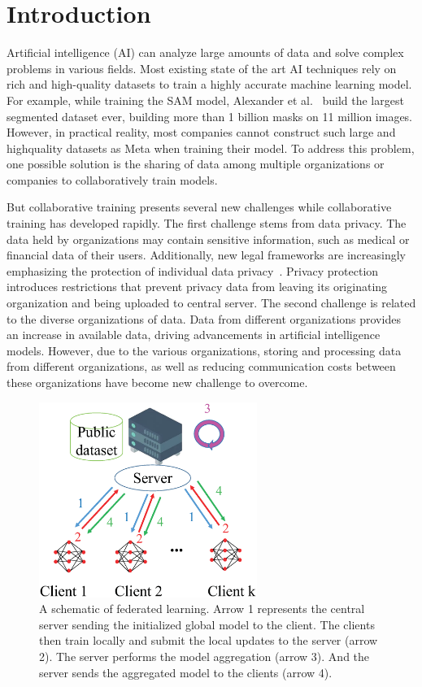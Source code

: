 \section{Introduction}
Artificial intelligence (AI) can analyze large amounts
of data and solve complex problems in various fields.
Most existing state of the art AI techniques rely on
rich and high-quality datasets to train a highly accurate
machine learning model. For example, while training
the SAM model, Alexander et al.~\cite{kirillov2023segment} build the largest
segmented dataset ever, building more than 1 billion
masks on 11 million images. However, in practical reality,
most companies cannot construct such large and highquality datasets as Meta when training their model. To
address this problem, one possible solution is the sharing
of data among multiple organizations or companies to
collaboratively train models.

But collaborative training presents several new challenges while collaborative training has developed rapidly.
The first challenge stems from data privacy. The data held
by organizations may contain sensitive information, such
as medical or financial data of their users. Additionally,
new legal frameworks are increasingly emphasizing the
protection of individual data privacy~\cite{voigt2017eu}. Privacy protection introduces restrictions that prevent privacy data from
leaving its originating organization and being uploaded
to central server. The second challenge is related to the
diverse organizations of data. Data from different organizations provides an increase in available data, driving
advancements in artificial intelligence models. However,
due to the various organizations, storing and processing
data from different organizations, as well as reducing communication costs between these organizations have
become new challenge to overcome.

\begin{figure}[t]
    \centering
  
    \includegraphics[width=1.0\linewidth,height=2.5in]{output/fig1.eps}
     \caption{A schematic of federated learning. Arrow 1 represents the
     central server sending the initialized global model to the client. The
     clients then train locally and submit the local updates to the server
     (arrow 2). The server performs the model aggregation (arrow 3). And
     the server sends the aggregated model to the clients (arrow 4).}
     \label{fig1}
\end{figure}


